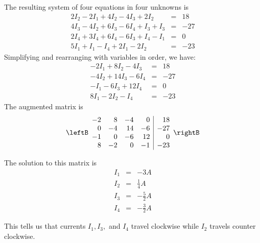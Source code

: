 \begin{solution}
The resulting system of four equations in four unknowns is 
\begin{eqnarray*}
2I_{2}-2I_{1}+4I_{2}-4I_{3}+2I_{2}&=&18 \\
4I_{3} - 4I_{2} + 6I_{3} - 6I_{4} + I_{3} + I_{3} &=& -27 \\
2I_{4} + 3I_{4} + 6I_{4} - 6I_{3} + I_{4} - I_{1} &=& 0 \\
5I_{1}+I_{1}-I_{4}+2I_{1}-2I_{2}&=& -23
\end{eqnarray*}
Simplifying and rearranging with variables in order, we have:
\begin{eqnarray*}
-2I_{1}+8I_{2}-4I_{3}&=&18 \\
- 4I_{2} + 14I_{3} - 6I_{4} &=& -27 \\
-I_{1} - 6I_{3} + 12I_{4} &=& 0 \\
8I_{1}-2I_{2} - I_{4} &=& -23
\end{eqnarray*}
The augmented matrix is 
\[
\leftB
\begin{array}{rrrr|r}
-2 & 8 & -4 & 0 & 18 \\
0 & -4 & 14 & -6 & -27 \\
-1 & 0 & -6 & 12 & 0 \\
8 & -2 & 0 & -1 & -23
\end{array}
\rightB
\]

The solution to this matrix is
\begin{eqnarray*}
I_{1} &=& -3 A\\
I_{2} &=& \frac{1}{4} A\\
I_{3} &=& -\frac{5}{2} A\\
I_{4} &=& -\frac{3}{2} A
\end{eqnarray*}

This tells us that currents $I_1, I_3,$ and $I_4$ travel clockwise while $I_2$ travels counter clockwise. 
\end{solution}

